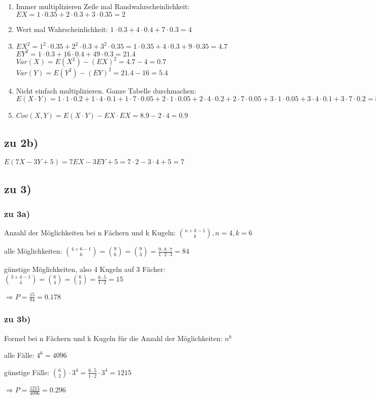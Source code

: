 \begin{enumerate}
\item Immer multiplizieren Zeile mal Randwahrscheinlichkeit: $ EX = 1\cdot 0.35 + 2\cdot 0.3 + 3\cdot 0.35 = 2$
\item Wert mal Wahrscheinlichkeit: $ 1\cdot 0.3 + 4\cdot 0.4 + 7\cdot 0.3 = 4$
\item $EX^2 = 1^2 \cdot 0.35 + 2^2\cdot 0.3 + 3^2\cdot 0.35 = 1\cdot 0.35 + 4\cdot 0.3 + 9\cdot 0.35 = 4.7$\\
$EY^2 = 1\cdot 0.3 + 16\cdot 0.4 + 49\cdot 0.3 = 21.4 $\\
$Var(X) = E(X^2) - (EX)^2 = 4.7 - 4 = 0.7$\\
$Var(Y) = E(Y^2) - (EY)^2 = 21.4 - 16 = 5.4$\\
\item Nicht einfach multiplizieren. Ganze Tabelle durchmachen: $ E(X\cdot Y) = 
1\cdot 1\cdot 0.2 + 
1\cdot 4\cdot 0.1 + 
1\cdot 7\cdot 0.05 + 
2\cdot 1\cdot 0.05 + 
2\cdot 4\cdot 0.2 + 
2\cdot 7\cdot 0.05 + 
3\cdot 1\cdot 0.05 + 
3\cdot 4\cdot 0.1 + 
3\cdot 7\cdot 0.2 = 8.9
$
\item $ Cov(X,Y) = E(X\cdot Y) - EX\cdot EX = 8.9 - 2 \cdot 4 = 0.9$
\end{enumerate}

\subsection{zu 2b)}
$ E(7X - 3Y + 5) = 7 EX - 3 EY + 5 = 7\cdot 2 - 3\cdot 4 + 5 = 7$

\subsection{zu 3)}

\subsubsection{zu 3a)}
Anzahl der Möglichkeiten bei n Fächern und k Kugeln: 
$ \binom{n+k-1}{k}, n=4, k=6 $

alle Möglichkeiten: $ \binom{4+6-1}{6} = \binom 9 6 = \binom 9 3 = \frac{9\cdot 8\cdot 7}{1\cdot 2\cdot 3} = 84$

günstige Möglichkeiten, also 4 Kugeln auf 3 Fächer: $ \binom{3+4-1}{4} = \binom 6 4 = \binom 6 2 = \frac{6\cdot 5}{1\cdot 2} = 15$

$\Rightarrow P = \frac{15}{84} = 0.178 $

\subsubsection{zu 3b)}
Formel bei n Fächern und k Kugeln für die Anzahl der Möglichkeiten: $ n^k $

alle Fälle: $4^6 = 4096 $

günstige Fälle: $ \binom 6 2 \cdot 3^4 = \frac{6\cdot 5}{1\cdot 2} \cdot 3^4 = 1215 $   

$\Rightarrow P = \frac{1215}{4096} = 0.296$

